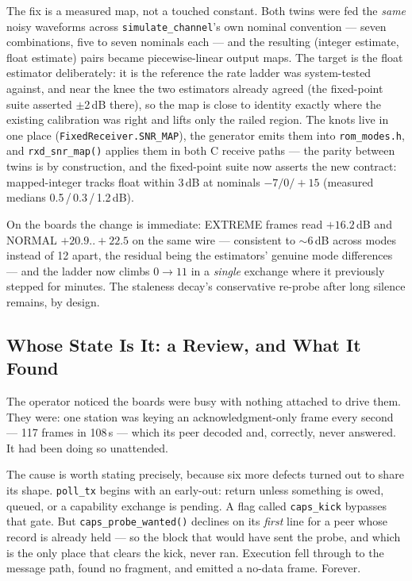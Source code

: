 The fix is a measured map, not a touched constant. Both twins were fed
the \emph{same} noisy waveforms across \texttt{simulate\_channel}'s own
nominal convention --- seven combinations, five to seven nominals each
--- and the resulting (integer estimate, float estimate) pairs became
piecewise-linear output maps. The target is the float estimator
deliberately: it is the reference the rate ladder was system-tested
against, and near the knee the two estimators already agreed (the
fixed-point suite asserted $\pm$2\,dB there), so the map is close to
identity exactly where the existing calibration was right and lifts
only the railed region. The knots live in one place
(\texttt{FixedReceiver.SNR\_MAP}), the generator emits them into
\texttt{rom\_modes.h}, and \texttt{rxd\_snr\_map()} applies them in
both C receive paths --- the parity between twins is by construction,
and the fixed-point suite now asserts the new contract: mapped-integer
tracks float within 3\,dB at nominals $-7/0/{+}15$ (measured medians
0.5\,/\,0.3\,/\,1.2\,dB).

On the boards the change is immediate: EXTREME frames read
$+16.2$\,dB and NORMAL $+20.9..{+}22.5$ on the same wire ---
consistent to $\sim$6\,dB across modes instead of 12 apart, the
residual being the estimators' genuine mode differences --- and the
ladder now climbs $0 \to 11$ in a \emph{single} exchange where it
previously stepped for minutes. The staleness decay's conservative
re-probe after long silence remains, by design.

\subsection{Whose State Is It: a Review, and What It Found}
\label{sec:cport_review}

The operator noticed the boards were busy with nothing attached to
drive them.  They were: one station was keying an acknowledgment-only
frame every second --- 117 frames in 108\,s --- which its peer decoded
and, correctly, never answered.  It had been doing so unattended.

The cause is worth stating precisely, because six more defects turned
out to share its shape.  \texttt{poll\_tx} begins with an early-out:
return unless something is owed, queued, or a capability exchange is
pending.  A flag called \texttt{caps\_kick} bypasses that gate.  But
\texttt{caps\_probe\_wanted()} declines on its \emph{first} line for a
peer whose record is already held --- so the block that would have sent
the probe, and which is the only place that clears the kick, never ran.
Execution fell through to the message path, found no fragment, and
emitted a no-data frame.  Forever.

